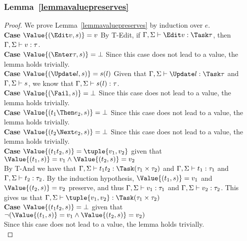 \subsubsection{Lemma~\ref{lemmavaluepreserves}}
\begin{proof}
  We prove Lemma~\ref{lemmavaluepreserves} by induction over $e$.\\

  \noindent\textbf{Case} $\Value{(\Edit v,s)}=v$ By T-Edit, if $\Gamma,\Sigma\infers \Edit v:\Task\tau$, then $\Gamma,\Sigma\vdash v:\tau$.\\

  \noindent\textbf{Case} $\Value{(\Enter \tau,s)}=\bot$ Since this case does not lead to a value, the lemma holds trivially.\\

  \noindent\textbf{Case} $\Value{(\Update l,s)}=s(l)$ Given that $\Gamma,\Sigma\infers\Update l:\Task \tau$ and $\Gamma,\Sigma\vdash s$, we know that $\Gamma,\Sigma\vdash s(l):\tau$.\\

  \noindent\textbf{Case} $\Value{(\Fail,s)}=\bot$ Since this case does not lead to a value, the lemma holds trivially.\\

  \noindent\textbf{Case} $\Value{(t_1\Then e_2,s)}=\bot$ Since this case does not lead to a value, the lemma holds trivially.\\

  \noindent\textbf{Case} $\Value{(t_2\Next e_2,s)}=\bot$ Since this case does not lead to a value, the lemma holds trivially.\\

  \noindent\textbf{Case} $\Value{(t_1\And t_2,s)}=\tuple{v_1, v_2}$ given that $\Value{(t_1,s)}=v_1\wedge\Value{(t_2,s)}=v_2$\\ By T-And we have that $\Gamma,\Sigma\infers t_1\And t_2:\Task(\tau_1\times\tau_2)$ and $\Gamma,\Sigma\vdash t_1:\tau_1$ and $\Gamma,\Sigma\vdash t_2:\tau_2$. By the induction hypothesis, $ \Value{(t_1,s)}=v_1$ and $\Value{(t_2,s)}=v_2$ preserve, and thus $\Gamma,\Sigma\vdash v_1:\tau_1$ and $\Gamma,\Sigma\vdash v_2:\tau_2$. This gives us that $\Gamma,\Sigma\infers \tuple{v_1, v_2}:\Task(\tau_1\times\tau_2)$ \\

  \noindent\textbf{Case} $\Value{(t_1\And t_2,s)}=\bot$ given that $\neg(\Value{(t_1,s)}=v_1\wedge\Value{(t_2,s)}=v_2)$\\ Since this case does not lead to a value, the lemma holds trivially.\\


\end{proof}
